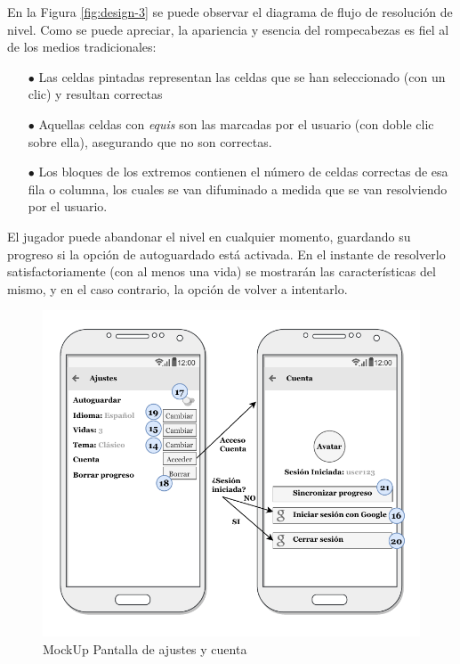En la Figura \ref{fig:design-3} se puede observar el diagrama de flujo de resolución
de nivel. 
Como se puede apreciar, la apariencia y esencia del rompecabezas es fiel al de los medios tradicionales:

\begin{itemize}
  \item[$\bullet$] Las celdas pintadas representan las celdas que se han seleccionado (con un clic) y
  resultan correctas
  \item[$\bullet$] Aquellas celdas con \textit{equis} son las marcadas  por el
  usuario (con doble clic sobre ella), asegurando que no son correctas.
  \item[$\bullet$] Los bloques de los extremos contienen el número
  de celdas correctas de esa fila o columna, los cuales se van difuminado a medida que se van
  resolviendo por el usuario.
\end{itemize}

El jugador puede abandonar el nivel en cualquier momento, guardando su progreso si la opción de autoguardado
está activada. En el instante de resolverlo satisfactoriamente (con al menos una vida) se mostrarán
las características del mismo, y en el caso contrario, la opción de volver a intentarlo.

\begin{figure}[H]
  \centering
  \includegraphics[scale=0.83]{images/screen5.pdf}
  \caption{MockUp Pantalla de ajustes y cuenta}
  \label{fig:design-4}
\end{figure}

